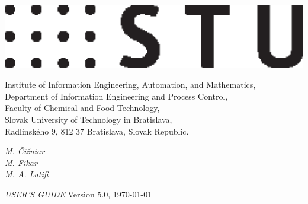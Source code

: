 \begin{minipage}[t]{1\linewidth}
  \vspace{0.1cm}
  \begin{minipage}[t]{0.78\linewidth}
    \vspace{0.1cm}
    \begin{minipage}[t]{0.165\linewidth}
      \vspace{0.1cm}
      \begin{flushleft}
        \includegraphics[width=1\textwidth]{pictures/logostu}
      \end{flushleft}
    \end{minipage}
    \begin{minipage}[t]{0.82\linewidth}
      \vspace{0.1cm}
      \begin{flushleft}
        {\footnotesize{
          \textcolor{black!80!white}{
            Institute of Information Engineering, Automation, and
            Mathematics,\\ 
            Department of Information Engineering and Process
            Control,\\ 
            Faculty of Chemical and Food Technology,\\
            Slovak University of Technology in Bratislava,\\
            Rad\-lin\-sk\'e\-ho 9, 812 37 Bratislava, Slovak Republic.
          }
        }}
      \end{flushleft}
    \end{minipage}
    \vspace{2cm}
    \begin{flushright}
      \dynopttitle
      \vspace{1cm}
      {\large{\emph{
        M. \v{C}i\v{z}niar~~~~~\\
        M. Fikar~~~~~\\
        M. A. Latifi~~~~~\\
      }}}
    \end{flushright}
    \vspace{13cm}
    {\LARGE{\emph{USER'S GUIDE}}} 
    \hfill {\large{Version 5.0, \today}}
  \end{minipage}

\end{minipage}
